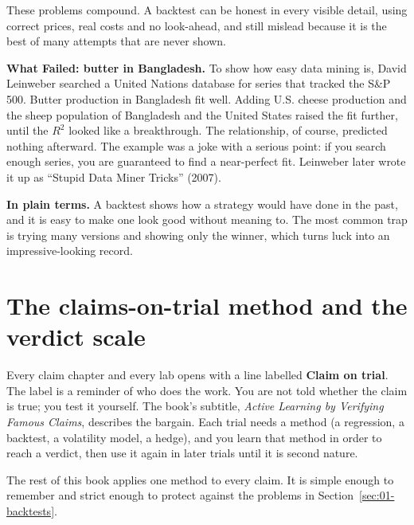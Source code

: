 These problems compound. A backtest can be honest in every visible detail, using correct prices, real costs and no look-ahead, and still mislead because it is the best of many attempts that are never shown.

\begin{callout}
\textbf{What Failed: butter in Bangladesh.} To show how easy data mining is, David Leinweber searched a United Nations database for series that tracked the S\&P 500. Butter production in Bangladesh fit well. Adding U.S. cheese production and the sheep population of Bangladesh and the United States raised the fit further, until the $R^2$ looked like a breakthrough. The relationship, of course, predicted nothing afterward. The example was a joke with a serious point: if you search enough series, you are guaranteed to find a near-perfect fit. Leinweber later wrote it up as ``Stupid Data Miner Tricks'' (2007).
\end{callout}

\noindent\textbf{In plain terms.} A backtest shows how a strategy would have done in the past, and it is easy to make one look good without meaning to. The most common trap is trying many versions and showing only the winner, which turns luck into an impressive-looking record.

\section{The claims-on-trial method and the verdict scale}
\label{sec:01-method}

Every claim chapter and every lab opens with a line labelled \textbf{Claim on trial}. The label is a reminder of who does the work. You are not told whether the claim is true; you test it yourself. The book's subtitle, \emph{Active Learning by Verifying Famous Claims}, describes the bargain. Each trial needs a method (a regression, a backtest, a volatility model, a hedge), and you learn that method in order to reach a verdict, then use it again in later trials until it is second nature.

The rest of this book applies one method to every claim. It is simple enough to remember and strict enough to protect against the problems in Section~\ref{sec:01-backtests}.

